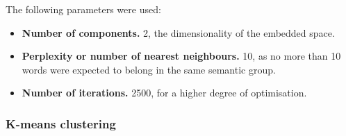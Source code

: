 \documentclass[14pt, a4paper]{extreport}
\begin{document}
The following parameters were used:

\begin{itemize}
  \item \textbf{Number of components.} 2, the dimensionality of the embedded space.
  \item \textbf{Perplexity or number of nearest neighbours.} 10, as no more than 10 words were expected to belong in the same semantic group.
  \item \textbf{Number of iterations.} 2500, for a higher degree of optimisation.
\end{itemize}
      \subsubsection{K-means clustering}
\end{document}
